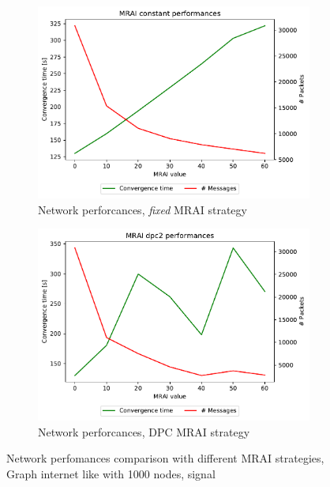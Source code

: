 \begin{figure}[h]
     \centering
     \begin{subfigure}[b]{0.45\textwidth}
         \centering
         \includegraphics[width=\textwidth]{images/internet_like/1000/signals/AWAWA/constant/internet_like-constant_AWAWA_mrai_evolution.pdf}
		 \caption{Network perforcances, \textit{fixed} \ac{MRAI} strategy}
         \label{fig:internet_like_1000_fixed_AWAWA}
     \end{subfigure}
     \hfill
     \begin{subfigure}[b]{0.45\textwidth}
         \centering
         \includegraphics[width=\textwidth]{images/internet_like/1000/signals/AWAWA/dpc/internet_like-DPC_AWAWA_mrai_evolution.pdf}
		 \caption{Network perforcances, \ac{DPC} \ac{MRAI} strategy}
         \label{fig:internet_like_1000_dpc_AWAWA}
     \end{subfigure}
	 \caption{Network perfomances comparison with different \ac{MRAI} strategies,
		Graph internet like with \num{1000} nodes, signal }
        \label{fig:internt_like_1000_evolution_AWAWA}
\end{figure}

